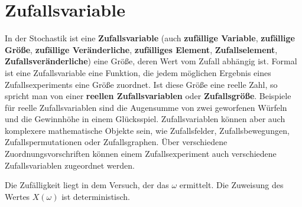 \documentclass[../Main.tex]{subfiles}
\begin{document}
\section{Zufallsvariable}
In der Stochastik ist eine \textbf{Zufallsvariable} (auch \textbf{zufällige Variable}, \textbf{zufällige Größe}, \textbf{zufällige Veränderliche}, \textbf{zufälliges Element}, \textbf{Zufallselement}, \textbf{Zufallsveränderliche}) eine Größe, deren Wert vom Zufall abhängig ist. Formal ist eine Zufallsvariable eine Funktion, die jedem möglichen Ergebnis eines Zufallsexperiments eine Größe zuordnet. Ist diese Größe eine reelle Zahl, so spricht man von einer \textbf{reellen Zufallsvariablen} oder \textbf{Zufallsgröße}. Beispiele für reelle Zufallsvariablen sind die Augensumme von zwei geworfenen Würfeln und die Gewinnhöhe in einem Glücksspiel. Zufallsvariablen können aber auch komplexere mathematische Objekte sein, wie Zufallsfelder, Zufallsbewegungen, Zufallspermutationen oder Zufallsgraphen. Über verschiedene Zuordnungsvorschriften können einem Zufallsexperiment auch verschiedene Zufallsvariablen zugeordnet werden.

Die Zufälligkeit liegt in dem Versuch, der das \(\omega\) ermittelt.
Die Zuweisung des Wertes \(X(\omega)\) ist deterministisch.
\end{document}
